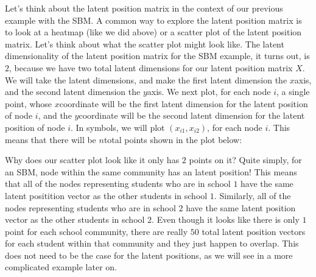 \documentclass[letterpaper,10pt,english]{jupyterBook}
\begin{document}
\sphinxAtStartPar
Let’s think about the latent position matrix in the context of our previous example with the SBM. A common way to explore the latent position matrix is to look at a heatmap (like we did above) or a scatter plot of the latent position matrix. Let’s think about what the scatter plot might look like. The latent dimensionality of the latent position matrix for the SBM example, it turns out, is \(2\), because we have two total latent dimensions for our latent position matrix \(X\). We will take the latent dimensions, and make the first latent dimension the \(x\)\sphinxhyphen{}axis, and the second latent dimension the \(y\)\sphinxhyphen{}axis. We next plot, for each node \(i\), a single point, whose \(x\)\sphinxhyphen{}coordinate will be the first latent dimension for the latent position of node \(i\), and the \(y\)\sphinxhyphen{}coordinate will be the second latent dimension for the latent position of node \(i\). In symbols, we will plot \((x_{i1}, x_{i2})\), for each node \(i\). This means that there will be \(n\)\sphinxhyphen{}total points shown in the plot below:

\noindent{}

\sphinxAtStartPar
Why does our scatter plot look like it only has \(2\) points on it? Quite simply, for an SBM,  node within the same community has an  latent position! This means that all of the nodes representing students who are in school \(1\) have the same latent positition vector as the other students in school \(1\). Similarly, all of the nodes representing students who are in school \(2\) have the same latent position vector as the other students in school \(2\). Even though it looks like there is only \(1\) point for each school community, there are really \(50\) total latent position vectors for each student within that community and they just happen to overlap. This does not need to be the case for the latent positions, as we will see in a more complicated example later on.
\end{document}
